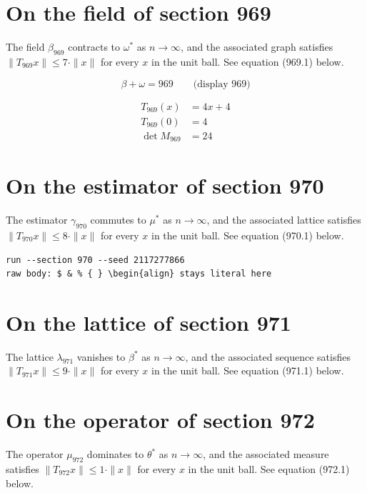 \documentclass{article}
\begin{document}
\section{On the field of section 969}
The field $\beta_{969}$ contracts to $\omega^{*}$ as $n \to \infty$,
and the associated graph satisfies $\|T_{969} x\| \leq 7 \cdot \|x\|$
for every $x$ in the unit ball. See equation (969.1) below.

$$
\beta + \omega = 969 \qquad \text{(display 969)}
$$

\begin{align}
T_{969}(x) &= 4 x + 4 \\
T_{969}(0) &= 4 \\
\det M_{969} &= 24
\end{align}

\section{On the estimator of section 970}
The estimator $\gamma_{970}$ commutes to $\mu^{*}$ as $n \to \infty$,
and the associated lattice satisfies $\|T_{970} x\| \leq 8 \cdot \|x\|$
for every $x$ in the unit ball. See equation (970.1) below.

\begin{verbatim}
run --section 970 --seed 2117277866
raw body: $ & % { } \begin{align} stays literal here
\end{verbatim}

\section{On the lattice of section 971}
The lattice $\lambda_{971}$ vanishes to $\beta^{*}$ as $n \to \infty$,
and the associated sequence satisfies $\|T_{971} x\| \leq 9 \cdot \|x\|$
for every $x$ in the unit ball. See equation (971.1) below.

\section{On the operator of section 972}
The operator $\mu_{972}$ dominates to $\theta^{*}$ as $n \to \infty$,
and the associated measure satisfies $\|T_{972} x\| \leq 1 \cdot \|x\|$
for every $x$ in the unit ball. See equation (972.1) below.
\end{document}
